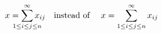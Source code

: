 \documentclass{article}
\begin{document}
\thispagestyle{empty}
\[
 x = \smashoperator{\sum_{1\le i\le j\le n}^{\infty}} x_{ij}  \quad \text{instead of }
  \quad x = \sum_{1\le i\le j\le n}^{\infty} x_{ij}
\]
\end{document}
